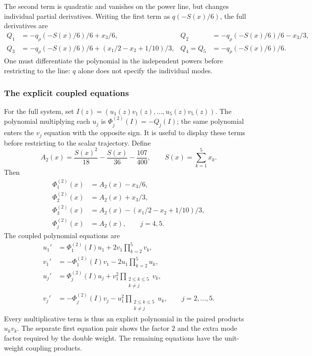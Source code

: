 \documentclass[11pt]{article}
\begin{document}
The second term is quadratic and vanishes on the power line, but changes individual partial derivatives. Writing the first term as $q(-S(x)/6)$, the full derivatives are
\[
\begin{aligned}
Q_1&=-q_\rho(-S(x)/6)/6+x_3/6,& Q_2&=-q_\rho(-S(x)/6)/6-x_3/3,\\
Q_3&=-q_\rho(-S(x)/6)/6+(x_1/2-x_2+1/10)/3,& Q_4=Q_5&=-q_\rho(-S(x)/6)/6.
\end{aligned}
\]
One must differentiate the polynomial in the independent powers before restricting to the line: $q$ alone does not specify the individual modes.

\subsubsection{The explicit coupled equations}

For the full system, set $I(z)=(u_1(z)v_1(z),\ldots,u_5(z)v_5(z))$. The polynomial multiplying each $u_j$ is $\Phi_j^{(2)}(I)=-Q_j(I)$; the same polynomial enters the $v_j$ equation with the opposite sign. It is useful to display these terms before restricting to the scalar trajectory. Define
\begin{equation}\label{ex:g2-common-phase}
A_2(x)=\frac{S(x)^2}{18}-\frac{S(x)}{36}-\frac{107}{400},\qquad S(x)=\sum_{k=1}^5x_k.
\end{equation}
Then
\begin{equation}\label{ex:g2-phases}
\begin{aligned}
\Phi_1^{(2)}(x)&=A_2(x)-x_3/6,\\
\Phi_2^{(2)}(x)&=A_2(x)+x_3/3,\\
\Phi_3^{(2)}(x)&=A_2(x)-(x_1/2-x_2+1/10)/3,\\
\Phi_j^{(2)}(x)&=A_2(x),\qquad j=4,5.
\end{aligned}
\end{equation}
The coupled polynomial equations are
\begin{equation}\label{ex:g2-coupled}
\begin{aligned}
u_1'&=\Phi_1^{(2)}(I)u_1+2v_1\prod_{k=2}^5v_k,\\
v_1'&=-\Phi_1^{(2)}(I)v_1-2u_1\prod_{k=2}^5u_k,\\
u_j'&=\Phi_j^{(2)}(I)u_j+v_1^2\prod_{\substack{2\le k\le 5\\k\ne j}}v_k,\\
v_j'&=-\Phi_j^{(2)}(I)v_j-u_1^2\prod_{\substack{2\le k\le 5\\k\ne j}}u_k,
\qquad j=2,\ldots,5.
\end{aligned}
\end{equation}
Every multiplicative term is thus an explicit polynomial in the paired products $u_kv_k$. The separate first equation pair shows the factor $2$ and the extra mode factor required by the double weight. The remaining equations have the unit-weight coupling products.
\end{document}
